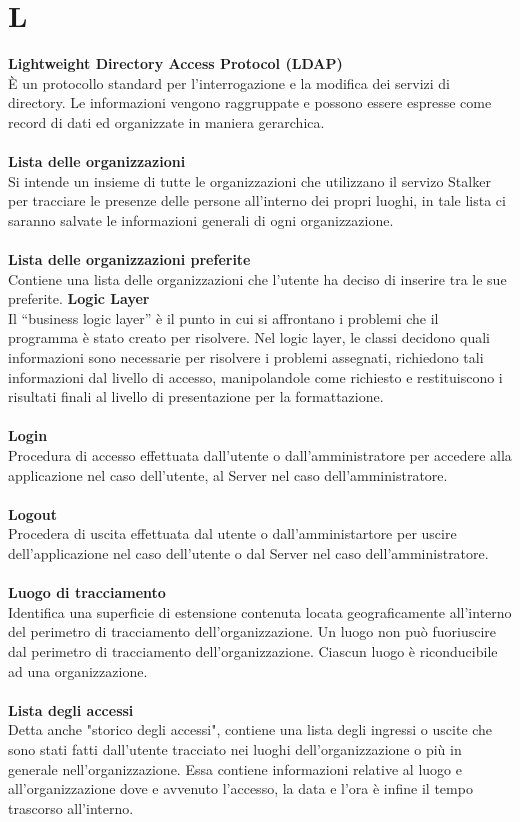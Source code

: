 \section{L}
\textbf{Lightweight Directory Access Protocol (LDAP)}\\
È un protocollo standard per l'interrogazione e la modifica dei servizi di directory. Le informazioni vengono raggruppate e possono essere espresse come record di dati ed organizzate in maniera gerarchica. \\ \\
\textbf{Lista delle organizzazioni}\\
Si intende un insieme di tutte le organizzazioni che utilizzano il servizo Stalker per tracciare le presenze delle persone all’interno dei propri luoghi, in tale lista ci saranno salvate le informazioni generali di ogni organizzazione.\\ \\
\textbf{Lista delle organizzazioni preferite}\\
Contiene una lista delle organizzazioni che l'utente ha deciso di inserire tra le sue preferite.
\textbf{Logic Layer}\\
Il “business logic layer” è il punto in cui si affrontano i problemi che il programma è stato creato per risolvere. Nel logic layer, le classi decidono quali informazioni sono necessarie per risolvere i problemi assegnati, richiedono tali informazioni dal livello di accesso, manipolandole come richiesto e restituiscono i risultati finali al livello di presentazione per la formattazione. \\ \\
\textbf{Login} \\
Procedura di accesso effettuata dall'utente o dall'amministratore per accedere alla applicazione nel caso dell'utente, al Server nel caso dell'amministratore.\\ \\
\textbf{Logout} \\
Procedera di uscita effettuata dal utente o dall'amministartore per uscire dell'applicazione nel caso dell'utente o dal Server nel caso dell'amministratore. \\ \\
\textbf{Luogo di tracciamento}\\
Identifica una superficie di estensione contenuta locata geograficamente all'interno del perimetro di tracciamento dell'organizzazione. Un luogo non può fuoriuscire dal perimetro di tracciamento dell'organizzazione. Ciascun luogo è riconducibile ad una organizzazione.\\ \\
\textbf{Lista degli accessi}\\
Detta anche "storico degli accessi", contiene una lista degli ingressi o uscite che sono stati fatti dall'utente tracciato nei luoghi dell'organizzazione o più in generale nell'organizzazione. Essa contiene informazioni relative al luogo e all'organizzazione dove e avvenuto l'accesso, la data e l'ora è infine il tempo trascorso all'interno.\\ \\
\clearpage